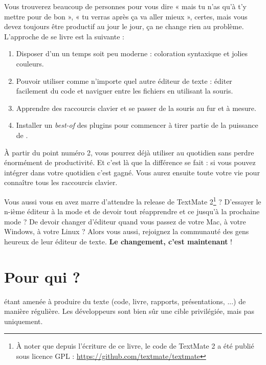 Vous trouverez beaucoup de personnes pour vous dire « mais tu n'as qu'à t'y mettre pour de bon », « tu verras après ça va aller mieux », certes, mais vous devez toujours être productif au jour le jour, ça ne change rien au problème. L'approche de se livre est la suivante :

\begin{enumerate}
    \item Disposer d'un \vim un temps soit peu moderne : coloration syntaxique et jolies couleurs.
    \item Pouvoir utiliser \vim comme n'importe quel autre éditeur de texte : éditer facilement du code et naviguer entre les fichiers en utilisant la souris.
    \item Apprendre des raccourcis clavier et se passer de la souris au fur et à mesure.
    \item Installer un \emph{best-of} des plugins pour commencer à tirer partie de la puissance de \vim.
\end{enumerate}

À partir du point numéro 2, vous pourrez déjà utiliser \vim au quotidien sans perdre énormément de productivité. Et c'est là que la différence se fait : si vous pouvez intégrer \vim dans votre quotidien c'est gagné. Vous aurez ensuite toute votre vie pour connaître tous les raccourcis clavier.

Vous aussi vous en avez marre d'attendre la release de TextMate 2\footnote{À noter que depuis l'écriture de ce livre, le code de TextMate 2 a été publié sous licence GPL : \url{https://github.com/textmate/textmate}} ? D'essayer le n-ième éditeur à la mode et de devoir tout réapprendre et ce jusqu'à la prochaine mode ? De devoir changer d'éditeur quand vous passez de votre Mac, à votre Windows, à votre Linux ? Alors vous aussi, rejoignez la communauté des gens heureux de leur éditeur de texte. \textbf{Le changement, c'est maintenant} !

\section{Pour qui ?}

 étant amenée à produire du texte (code, livre, rapports, présentations, ...) de manière régulière. Les développeurs sont bien sûr une cible privilégiée, mais pas uniquement.

